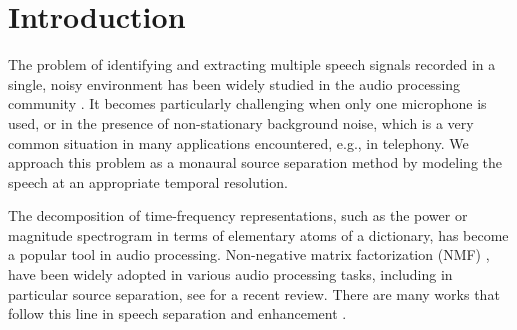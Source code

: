 \section{Introduction}

The problem of identifying and extracting multiple speech signals 
recorded in a single, noisy environment has been widely
studied in the audio processing community \cite{loizou2007speech,hansler2008speech}. 
It becomes particularly challenging when only one microphone is used, or in the presence of 
non-stationary background noise, which is a very common situation in many applications encountered, e.g., in telephony.
We approach this problem as a monaural source separation method
by modeling the speech at an appropriate temporal resolution.

The decomposition of time-frequency representations, such as the power or magnitude spectrogram
in terms of elementary atoms of a dictionary, has become a popular tool in audio processing. 
Non-negative matrix factorization (NMF) \cite{NMF, smaragdis2006probabilistic},
have been widely adopted in various audio processing tasks, including in particular source separation, see \cite{smaragdis2014static} for a recent review. 
There are many works that follow this line in speech separation \cite{schmidt06speechseparation,shashanka_icassp07} and enhancement \cite{JoderWEVS12,DuanMS12,schmidt07mlsp,mohammadiha2013supervised}. %

%

